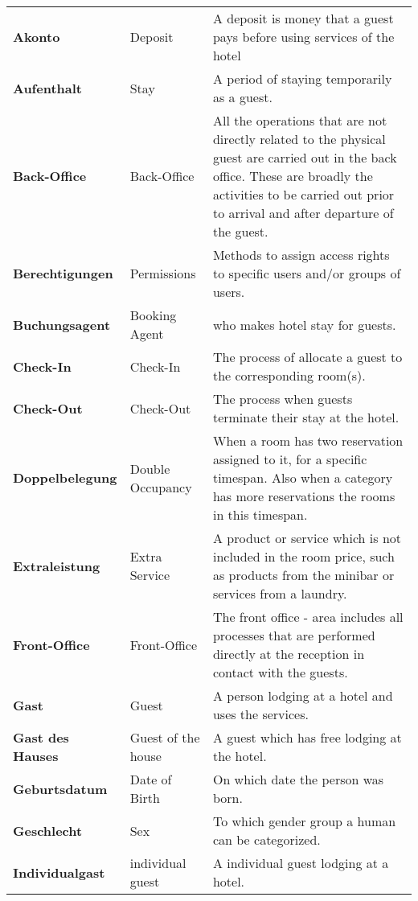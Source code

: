 \documentclass[../Pflichtenheft.tex]{subfiles}
\begin{document}
    \begin{longtable}{p{4cm} p{4cm} p{6cm}}
        \textbf{Akonto} & {Deposit} & A deposit is money that a guest pays before using services of the hotel \\[0.5cm]
        \textbf{Aufenthalt} & {Stay} & A period of staying temporarily as a guest. \\[0.5cm]
        \textbf{Back-Office} & {Back-Office} & All the operations that are not directly related to the physical guest are carried out in the back office. These are broadly the activities to be carried out prior to arrival and after departure of the guest. \\[0.5cm]
        \textbf{Berechtigungen} & {Permissions} & Methods to assign access rights to specific users and/or groups of users. \\[0.5cm]
        \textbf{Buchungsagent} & {Booking Agent} & who makes hotel stay for guests. \\[0.5cm]
        \textbf{Check-In} & {Check-In} & The process of allocate a guest to the corresponding room(s). \\[0.5cm]
        \textbf{Check-Out} & {Check-Out} & The process when guests terminate their stay at the hotel. \\[0.5cm]
        \textbf{Doppelbelegung} & {Double Occupancy} & When a room has two reservation assigned to it, for a specific timespan. Also when a category has more reservations the rooms in this timespan. \\[0.5cm]
        \textbf{Extraleistung} & {Extra Service} & A product or service which is not included in the room price, such as products from the minibar or services from a laundry. \\[0.5cm]
        \textbf{Front-Office} & {Front-Office} & The front office - area includes all processes that are performed directly at the reception in contact with the guests. \\[0.5cm]
        \textbf{Gast} & {Guest} & A person lodging at a hotel and uses the services. \\[0.5cm]
        \textbf{Gast des Hauses} & {Guest of the house} & A guest which has free lodging at the hotel. \\[0.5cm]
        \textbf{Geburtsdatum} & {Date of Birth} & On which date the person was born. \\[0.5cm]
        \textbf{Geschlecht} & {Sex} & To which gender group a human can be categorized. \\[0.5cm]
        \textbf{Individualgast} & {individual guest} & A individual guest lodging at a hotel. \\[0.5cm]

\end{longtable}
\end{document}
